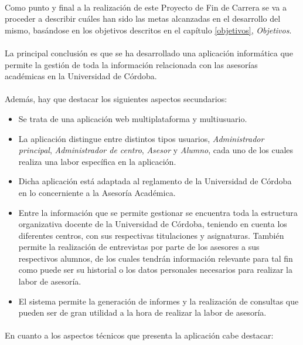 \paragraph{}Como punto y final a la realización de este Proyecto de Fin de
Carrera se va a proceder a describir cuáles han sido las metas alcanzadas en el
desarrollo del mismo, basándose en los objetivos descritos en el capítulo
\ref{objetivos}, \textit{Objetivos}.

\paragraph{}La principal conclusión es que se ha desarrollado una aplicación
 informática que permite la gestión de toda la información relacionada con las
 asesorías académicas en la Universidad de Córdoba.

\paragraph{}Además, hay que destacar los siguientes aspectos secundarios:

\begin{itemize}
 \item Se trata de una aplicación web multiplataforma y multiusuario.
 \item La aplicación distingue entre distintos tipos usuarios,
 \textit{Administrador principal}, \textit{Administrador de centro},
 \textit{Asesor} y \textit{Alumno}, cada uno de los cuales realiza una labor
 específica en la aplicación.
 \item Dicha aplicación está adaptada al reglamento de la Universidad de
 Córdoba en lo concerniente a la Asesoría Académica.
 \item Entre la información que se permite gestionar se encuentra toda la
 estructura organizativa docente de la Universidad de Córdoba, teniendo en
 cuenta los diferentes centros, con sus respectivas titulaciones y asignaturas.
 También permite la realización de entrevistas por parte de los asesores a sus
 respectivos alumnos, de los cuales tendrán información relevante para tal fin
 como puede ser su historial o los datos personales necesarios para realizar la
 labor de asesoría.
 \item El sistema permite la generación de informes y la realización de
 consultas que pueden ser de gran utilidad a la hora de realizar la labor
 de asesoría.
\end{itemize}

\paragraph{}En cuanto a los aspectos técnicos que presenta la aplicación cabe
destacar:

